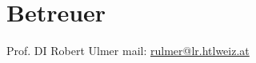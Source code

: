 \section{Betreuer}
Prof. DI Robert Ulmer \hspace{5em} mail: \href{mailto:rulmer@lr.htlweiz.at}{rulmer@lr.htlweiz.at}